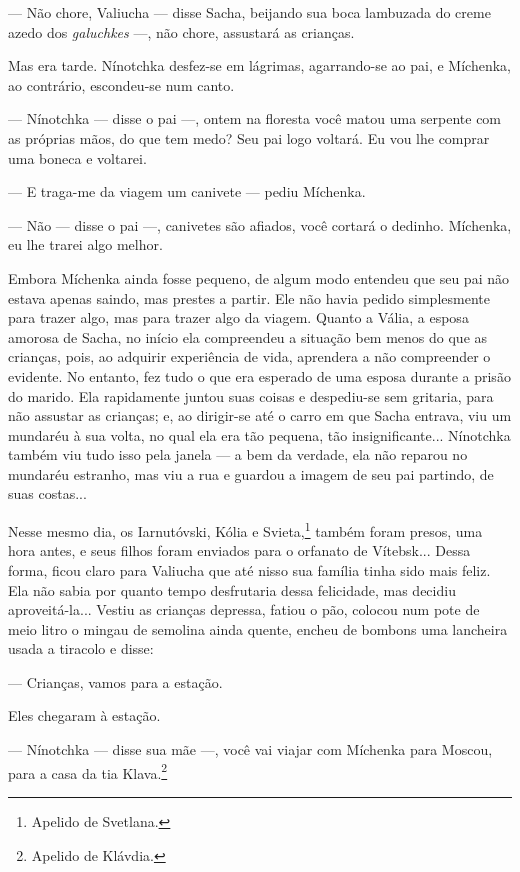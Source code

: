 --- Não chore, Valiucha --- disse Sacha, beijando sua boca lambuzada do
creme azedo dos \emph{galuchkes} ---, não chore, assustará as crianças.

Mas era tarde. Nínotchka desfez-se em lágrimas, agarrando-se ao pai, e
Míchenka, ao contrário, escondeu-se num canto.

--- Nínotchka --- disse o pai ---, ontem na floresta você matou uma
serpente com as próprias mãos, do que tem medo? Seu pai logo voltará. Eu
vou lhe comprar uma boneca e voltarei.

--- E traga-me da viagem um canivete --- pediu Míchenka.

--- Não --- disse o pai ---, canivetes são afiados, você cortará o
dedinho. Míchenka, eu lhe trarei algo melhor.

Embora Míchenka ainda fosse pequeno, de algum modo entendeu que seu pai
não estava apenas saindo, mas prestes a partir. Ele não havia pedido
simplesmente para trazer algo, mas para trazer algo da viagem. Quanto a
Vália, a esposa amorosa de Sacha, no início ela compreendeu a situação
bem menos do que as crianças, pois, ao adquirir experiência de vida,
aprendera a não compreender o evidente. No entanto, fez tudo o que era
esperado de uma esposa durante a prisão do marido. Ela rapidamente
juntou suas coisas e despediu-se sem gritaria, para não assustar as
crianças; e, ao dirigir-se até o carro em que Sacha entrava, viu um
mundaréu à sua volta, no qual ela era tão pequena, tão insignificante...
Nínotchka também viu tudo isso pela janela --- a bem da verdade, ela não
reparou no mundaréu estranho, mas viu a rua e guardou a imagem de seu
pai partindo, de suas costas...

Nesse mesmo dia, os Iarnutóvski, Kólia e Svieta,\footnote{Apelido de
  Svetlana.} também foram presos, uma hora antes, e seus filhos foram
enviados para o orfanato de Vítebsk... Dessa forma, ficou claro para
Valiucha que até nisso sua família tinha sido mais feliz. Ela não sabia
por quanto tempo desfrutaria dessa felicidade, mas decidiu
aproveitá-la... Vestiu as crianças depressa, fatiou o pão, colocou num
pote de meio litro o mingau de semolina ainda quente, encheu de bombons
uma lancheira usada a tiracolo e disse:

--- Crianças, vamos para a estação.

Eles chegaram à estação.

--- Nínotchka --- disse sua mãe ---, você vai viajar com Míchenka para
Moscou, para a casa da tia Klava.\footnote{Apelido de Klávdia.}

